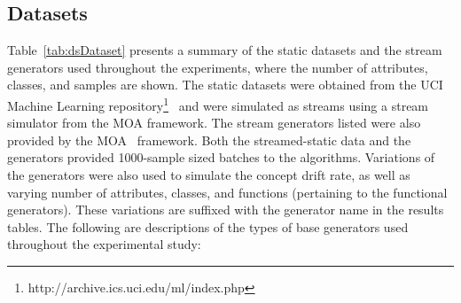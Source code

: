 \documentclass[reqno]{vcuthesis}
\numberwithin{equation}{chapter}
\begin{document}
\subsection{Datasets}
Table~\ref{tab:dsDataset} presents a summary of the static datasets and the stream generators used throughout the experiments, where the number of attributes, classes, and samples are shown. The static datasets were obtained from the UCI Machine Learning repository\footnote{http://archive.ics.uci.edu/ml/index.php}~\cite{Lichman:2013} and were simulated as streams using a stream simulator from the MOA framework. The stream generators listed were also provided by the MOA~\cite{moacite} framework. Both the streamed-static data and the generators provided 1000-sample sized batches to the algorithms. Variations of the generators were also used to simulate the concept drift rate, as well as varying number of attributes, classes, and functions (pertaining to the functional generators). These variations are suffixed with the generator name in the results tables. The following are descriptions of the types of base generators used throughout the experimental study:
\end{document}
